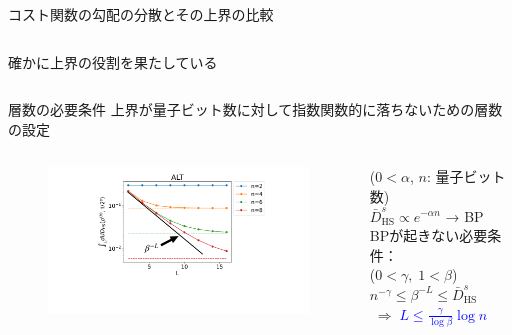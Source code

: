 \documentclass[dvipdfmx,10pt,aspectratio=169]{beamer}
\begin{document}
\begin{frame}{コスト関数の勾配の分散とその上界の比較}
\begin{columns}
\begin{column}{0.5\textwidth}
\begin{figure}[H]
            \end{figure}
            \begin{center}
                確かに上界の役割を果たしている
            \end{center}
        \end{column}
    \end{columns}
\end{frame}




\begin{frame}{層数の必要条件}
    上界が量子ビット数に対して指数関数的に落ちないための層数の設定\\
    \vspace*{10pt}
    \begin{columns}
        \begin{column}{0.65\textwidth}
            \begin{figure}
                \centering\includegraphics[width=8cm]{hsd-alt-analytical-with-line.pdf}
            \end{figure}
        \end{column}

        \begin{column}{0.35\textwidth}
            {\footnotesize($0<\alpha$, $n$: 量子ビット数)}\\
            \vspace*{2pt}
            $\bar{D}_{\mathrm{HS}}^s \propto e^{-\alpha n}$ → BP\\

            \vspace*{10pt}
            BPが起きない必要条件：\\
            {\footnotesize($0<\gamma,\;1<\beta$)}\\
            \vspace*{2pt}
            $n^{-\gamma} \leq \beta^{-L} \leq \bar{D}_{\mathrm{HS}}^s$\\
            \vspace*{2pt}
            \hspace*{5pt}$\;\Longrightarrow\;$\textcolor{blue}{$L \leq \frac{\gamma}{\log{\beta}}\log{n}$}\\


\end{column}
\end{columns}
\end{frame}
\end{document}
